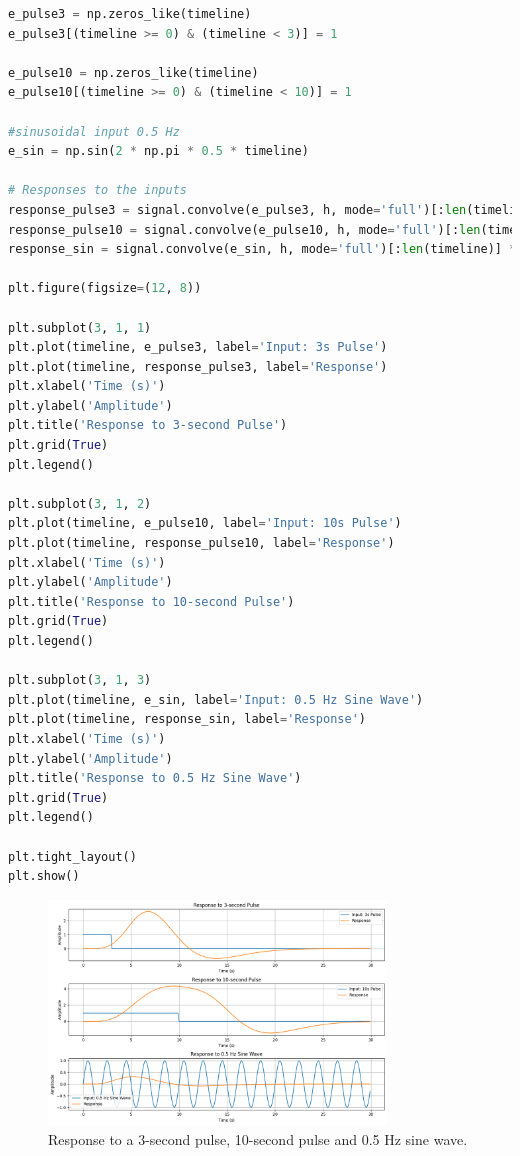 \documentclass[10pt]{article}
\theoremstyle{definition}
\theoremstyle{remark}
\theoremstyle{definition}
\numberwithin{equation}{prob}
\begin{document}
\begin{lstlisting}[language=Python]
e_pulse3 = np.zeros_like(timeline)
e_pulse3[(timeline >= 0) & (timeline < 3)] = 1

e_pulse10 = np.zeros_like(timeline)
e_pulse10[(timeline >= 0) & (timeline < 10)] = 1

#sinusoidal input 0.5 Hz
e_sin = np.sin(2 * np.pi * 0.5 * timeline)

# Responses to the inputs
response_pulse3 = signal.convolve(e_pulse3, h, mode='full')[:len(timeline)] * TR
response_pulse10 = signal.convolve(e_pulse10, h, mode='full')[:len(timeline)] * TR
response_sin = signal.convolve(e_sin, h, mode='full')[:len(timeline)] * TR

plt.figure(figsize=(12, 8))

plt.subplot(3, 1, 1)
plt.plot(timeline, e_pulse3, label='Input: 3s Pulse')
plt.plot(timeline, response_pulse3, label='Response')
plt.xlabel('Time (s)')
plt.ylabel('Amplitude')
plt.title('Response to 3-second Pulse')
plt.grid(True)
plt.legend()

plt.subplot(3, 1, 2)
plt.plot(timeline, e_pulse10, label='Input: 10s Pulse')
plt.plot(timeline, response_pulse10, label='Response')
plt.xlabel('Time (s)')
plt.ylabel('Amplitude')
plt.title('Response to 10-second Pulse')
plt.grid(True)
plt.legend()

plt.subplot(3, 1, 3)
plt.plot(timeline, e_sin, label='Input: 0.5 Hz Sine Wave')
plt.plot(timeline, response_sin, label='Response')
plt.xlabel('Time (s)')
plt.ylabel('Amplitude')
plt.title('Response to 0.5 Hz Sine Wave')
plt.grid(True)
plt.legend()

plt.tight_layout()
plt.show()
\end{lstlisting}

\begin{figure}[H]
    \centering
    \includegraphics[width=0.8\textwidth]{./figures/Hemodynamic Response Function Response.png}
    \caption{Response to a 3-second pulse, 10-second pulse and 0.5 Hz sine wave.}
\end{figure}
\end{document}

